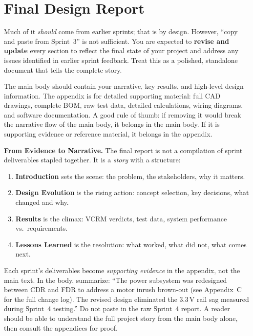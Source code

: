 \section{Final Design Report}

\begin{faqbox}
Much of it \textit{should} come from earlier sprints; that is by design. However, ``copy and paste from Sprint~3'' is not sufficient. You are expected to \textbf{revise and update} every section to reflect the final state of your project and address any issues identified in earlier sprint feedback. Treat this as a polished, standalone document that tells the complete story.
\end{faqbox}

\begin{faqbox}
The main body should contain your narrative, key results, and high-level design information. The appendix is for detailed supporting material: full CAD drawings, complete BOM, raw test data, detailed calculations, wiring diagrams, and software documentation. A good rule of thumb: if removing it would break the narrative flow of the main body, it belongs in the main body. If it is supporting evidence or reference material, it belongs in the appendix.
\end{faqbox}

\begin{protip}
\textbf{From Evidence to Narrative.} The final report is not a compilation of sprint deliverables stapled together. It is a \textit{story} with a structure:

\begin{enumerate}[leftmargin=*, itemsep=1pt, topsep=0pt]
    \item \textbf{Introduction} sets the scene: the problem, the stakeholders, why it matters.
    \item \textbf{Design Evolution} is the rising action: concept selection, key decisions, what changed and why.
    \item \textbf{Results} is the climax: VCRM verdicts, test data, system performance vs.\ requirements.
    \item \textbf{Lessons Learned} is the resolution: what worked, what did not, what comes next.
\end{enumerate}

Each sprint's deliverables become \textit{supporting evidence} in the appendix, not the main text. In the body, summarize: ``The power subsystem was redesigned between CDR and FDR to address a motor inrush brown-out (see Appendix~C for the full change log). The revised design eliminated the 3.3\,V rail sag measured during Sprint~4 testing.'' Do not paste in the raw Sprint~4 report. A reader should be able to understand the full project story from the main body alone, then consult the appendices for proof.
\end{protip}

